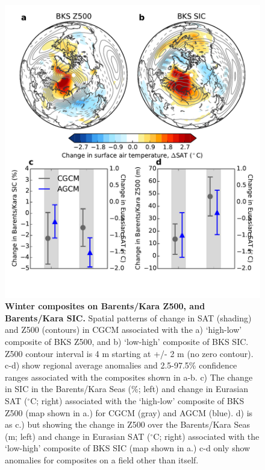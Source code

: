 \documentclass{nature}
\begin{document}
\begin{figure}%
\centering
\noindent\includegraphics[width=30pc]{Word/Figure_5.pdf}
\caption{\textbf{Winter composites on Barents/Kara Z500, and Barents/Kara SIC.} Spatial patterns of change in SAT (shading) and Z500 (contours) in CGCM associated with the a) `high-low' composite of BKS Z500, and b) `low-high' composite of BKS SIC. Z500 contour interval is 4 m starting at +/- 2 m (no zero contour). c-d) show regional average anomalies and 2.5-97.5\% confidence ranges associated with the composites shown in a-b. c) The change in SIC in the Barents/Kara Seas (\%; left) and change in Eurasian SAT ($^\circ$C; right) associated with the `high-low' composite of BKS Z500 (map shown in a.) for CGCM (gray) and AGCM (blue). d) is as c.) but showing the change in Z500 over the Barents/Kara Seas (m; left) and change in Eurasian SAT ($^\circ$C; right) associated with the `low-high' composite of BKS SIC (map shown in a.) c-d only show anomalies for composites on a field other than itself. }

\end{figure}
\end{document}
